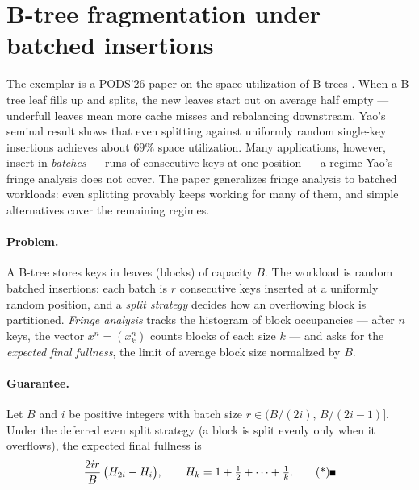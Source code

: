 \section{B-tree fragmentation under batched insertions}
\label{sec:spec-btree}

The exemplar is a PODS'26 paper on the space utilization of B-trees
\citep{sigmod26-038}\pods. When a B-tree leaf fills up and splits, the new
leaves start out on average half empty --- underfull leaves mean more cache
misses and rebalancing downstream. Yao's seminal result shows that even
splitting against uniformly random single-key insertions achieves about
$69\%$ space utilization. Many applications, however, insert in
\emph{batches} --- runs of consecutive keys at one position --- a regime
Yao's fringe analysis does not cover. The paper generalizes fringe analysis
to batched workloads: even splitting provably keeps working for many of
them, and simple alternatives cover the remaining regimes.

\paragraph{Problem.}
A B-tree stores keys in leaves (blocks) of capacity $B$. The workload is
random batched insertions: each batch is $r$ consecutive keys inserted at a
uniformly random position, and a \emph{split strategy} decides how an
overflowing block is partitioned. \emph{Fringe analysis} tracks the
histogram of block occupancies --- after $n$ keys, the vector $x^n =
(x^n_k)$ counts blocks of each size $k$ --- and asks for the \emph{expected
final fullness}, the limit of average block size normalized by $B$.

\paragraph{Guarantee.}

\begin{theorem}\label{thm:spec-btree-fullness}
Let $B$ and $i$ be positive integers with batch size $r \in \bigl(B/(2i),\,
B/(2i-1)\bigr]$. Under the deferred even split strategy (a block is split
evenly only when it overflows), the expected final fullness is
\[
\frac{2ir}{B}\,\bigl(H_{2i} - H_i\bigr),
\qquad
H_k = 1 + \tfrac{1}{2} + \dots + \tfrac{1}{k}. \eopm
\]
\end{theorem}


